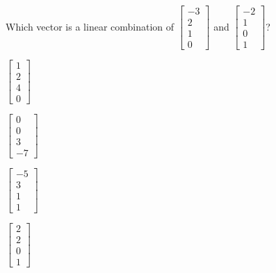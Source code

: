 \documentclass{article}
\begin{document}
\begin{readinessAssuranceTest}
\item Which vector is a linear combination of \(
\begin{bmatrix}
  -3 \\ 2 \\ 1 \\ 0
\end{bmatrix}\) and \(
\begin{bmatrix}
  -2 \\ 1 \\ 0 \\ 1
\end{bmatrix}\)?
  \begin{multicols}{4}
  \begin{readinessAssuranceTestChoices}
    \item \(
    \begin{bmatrix}
      1 \\ 2 \\ 4 \\ 0
    \end{bmatrix}
    \)
    \item \(
    \begin{bmatrix}
      0 \\ 0 \\ 3 \\ -7
    \end{bmatrix}
    \)
\item \(
    \begin{bmatrix}
      -5 \\ 3 \\ 1 \\ 1
    \end{bmatrix}
    \) %
\item \(
    \begin{bmatrix}
      2 \\ 2 \\ 0 \\ 1
    \end{bmatrix}
    \)

  \end{readinessAssuranceTestChoices}
  \end{multicols}



\end{readinessAssuranceTest}
\end{document}
